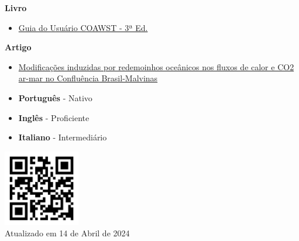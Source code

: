 \documentclass[9pt]{developercv} %
\begin{document}
\begin{minipage}[t]{0.3\textwidth}
	\vspace{-\baselineskip} %
	
	
	\textbf{Livro} %
	\textcolor{gray}{}
	 \begin{itemize}
		\item \small\textcolor{bleu_cite}{\href{http://mtc-m21c.sid.inpe.br/col/sid.inpe.br/mtc-m21c/2020/10.02.15.11/doc/publicacao.pdf}{Guia do Usuário COAWST - 3ª Ed.}}
	 \end{itemize}
	 \textbf{Artigo}
	 \begin{itemize}
		\item \small\textcolor{bleu_cite}{\href{https://www.nature.com/articles/s41598-021-89985-9}{Modificações induzidas por redemoinhos oceânicos nos fluxos de calor e CO2 ar-mar no Confluência Brasil-Malvinas}}
	 \end{itemize}  
\end{minipage}
\hfill
\begin{minipage}[t]{0.3\textwidth}
	\vspace{-\baselineskip} %

	\vspace{-0.3cm}
	\begin{itemize}
	\itemsep0em
	\item \textbf{Português} - Nativo
	\item \textbf{Inglês} - Proficiente
	\item \textbf{Italiano} - Intermediário 
	\end{itemize}
	\vspace{0.2cm}
	
    \centering\includegraphics[width=0.25\textwidth]{qrcode.png}\\
	\centering\tiny Atualizado em 14 de Abril de 2024
\end{minipage}
\end{document}
